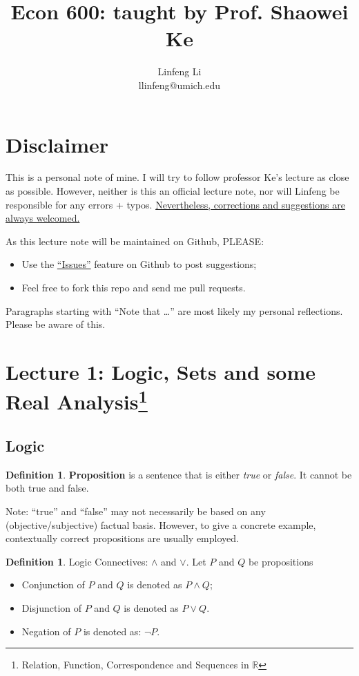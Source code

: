 \documentclass[12pt]{article}
\title{Econ 600: taught by Prof. Shaowei Ke}
\author{Linfeng Li \\ llinfeng@umich.edu}
\newcommand{\R}{{\mathbb R}}
\theoremstyle{definition}
\newtheorem{definition}[theorem]{Definition}
\theoremstyle{plain}
\begin{document}
\maketitle

\section*{Disclaimer}
This is a personal note of mine. I will try to follow professor Ke's lecture as
close as possible. However, neither is this an official lecture note, nor will
Linfeng be responsible for any errors + typos.
\underline{Nevertheless, corrections and suggestions are always welcomed.}

\smallskip

As this lecture note will be maintained on Github, PLEASE:
\begin{itemize}
    \item Use the \href{https://github.com/llinfeng/Econ_600/issues}{``Issues''} feature on Github to post suggestions;
    \item Feel free to fork this repo and send me pull requests.
\end{itemize}
Paragraphs starting with ``Note that \ldots'' are most likely my personal
reflections. Please be aware of this.

\section{Lecture 1: Logic, Sets and some Real Analysis\footnote{Relation,
Function, Correspondence and Sequences in $\R$}}

\subsection{Logic}
\begin{definition}
    \textbf{Proposition} is a sentence that is either \textit{true} or
    \textit{false}. It cannot be both true and false.
\end{definition}
Note: ``true'' and ``false'' may not necessarily be based on any (objective/subjective)
factual basis. However, to give a concrete example, contextually correct
propositions are usually employed.

\begin{definition}
    Logic Connectives: $\land$ and $\lor$. Let $P$ and $Q$ be propositions
    \begin{itemize}
        \item Conjunction of $P$ and $Q$ is denoted as $P \land Q$;
        \item Disjunction of $P$ and $Q$ is denoted as $P \lor  Q$.
        \item Negation of $P$ is denoted as: $\neg P$.
    \end{itemize}
\end{definition}
\end{document}
